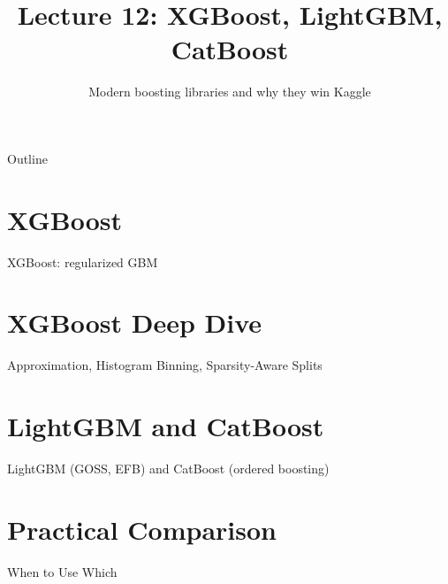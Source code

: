 \documentclass[aspectratio=169]{beamer}
\title{Lecture 12: XGBoost, LightGBM, CatBoost}
\subtitle{Modern boosting libraries and why they win Kaggle}
\date{}
\begin{document}
\begin{frame}\titlepage\end{frame}

\begin{frame}{Outline}
  \tableofcontents
\end{frame}

\section{XGBoost}
\begin{frame}{XGBoost: regularized GBM}
\end{frame}

\section{XGBoost Deep Dive}
\begin{frame}{Approximation, Histogram Binning, Sparsity-Aware Splits}
\end{frame}

\section{LightGBM and CatBoost}
\begin{frame}{LightGBM (GOSS, EFB) and CatBoost (ordered boosting)}
\end{frame}

\section{Practical Comparison}
\begin{frame}{When to Use Which}
\end{frame}
\end{document}
